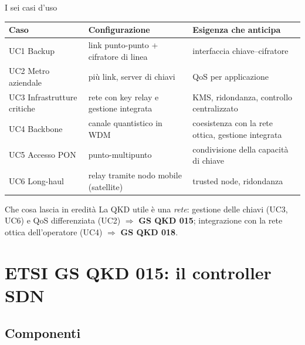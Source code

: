 \documentclass[10pt]{beamer}
\begin{document}
\begin{frame}{I sei casi d'uso}
  \scriptsize
  \begin{tabularx}{\textwidth}{@{}l L L@{}}
    \toprule
    \textbf{Caso} & \textbf{Configurazione} & \textbf{Esigenza che anticipa} \\
    \midrule
    UC1 Backup & link punto-punto + cifratore di linea & interfaccia chiave–cifratore \\
    UC2 Metro aziendale & più link, server di chiavi & QoS per applicazione \\
    UC3 Infrastrutture critiche & rete con key relay e gestione integrata & KMS, ridondanza, controllo centralizzato \\
    UC4 Backbone & canale quantistico in WDM & coesistenza con la rete ottica, gestione integrata \\
    UC5 Accesso PON & punto-multipunto & condivisione della capacità di chiave \\
    UC6 Long-haul & relay tramite nodo mobile (satellite) & trusted node, ridondanza \\
    \bottomrule
  \end{tabularx}
  \vspace{1ex}
  \footnotesize
  \begin{exampleblock}{Che cosa lascia in eredità}
    La QKD utile è una \emph{rete}: gestione delle chiavi (UC3, UC6) e QoS
    differenziata (UC2) $\Rightarrow$ \textbf{GS QKD 015}; integrazione con
    la rete ottica dell'operatore (UC4) $\Rightarrow$ \textbf{GS QKD 018}.
  \end{exampleblock}
\end{frame}

\section[GS QKD 015]{ETSI GS QKD 015: il controller SDN}

\subsection{Componenti}
\end{document}
